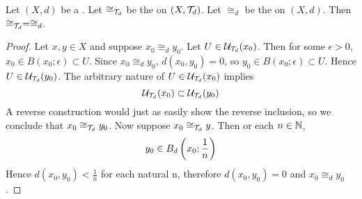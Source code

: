 
\begin{prop}
    \label{prop:relationofzerodistance}
    Let $(X,d)$ be a \PseudometricSpace.
    Let $\cong_{\mathcal{T}_d}$ be the \RelationOfEqualNeighborhoodFilters on $(X,\mathcal{T}_d)$. 
    Let $\cong_d$ be the \RelationOfZeroDistance on $(X,d)$. 
    Then $\cong_{\mathcal{T}_d} = \cong_d$. 
    \begin{proof}
        Let $x,y \in X$ and suppose $x_0 \cong_d y_0$.
        Let $U \in \mathcal{U}_{\mathcal{T}_d}(x_0)$. Then for some $\epsilon > 0$, 
        $x_0 \in B(x_0;\epsilon) \subset U$. 
        Since $x_0 \cong_d y_0$, $d(x_0,y_0) = 0$, so $y_0 \in B(x_0 ; \epsilon) \subset U$. 
        Hence $U \in \mathcal{U}_{\mathcal{T}_d}(y_0)$. 
        The arbitrary nature of $U \in \mathcal{U}_{\mathcal{T}_d}(x_0)$ implies 
        \begin{equation}
            \mathcal{U}_{\mathcal{T}_d}(x_0) \subset \mathcal{U}_{\mathcal{T}_d}(y_0)
        \end{equation}
        A reverse construction would just as easily show the reverse inclusion, so we conclude that $x_0 \cong_{\mathcal{T}_d} y_0$. 
        Now suppose $x_0 \cong_{\mathcal{T}_d} y $. Then or each $n \in \mathbb{N}$, 
        \begin{equation}
            y_0 \in B_{d} \left( x_0 ; \frac{1}{n}\right)
        \end{equation}
        Hence $d(x_0, y_0) < \frac{1}{n}$ for each natural n, therefore $d(x_0,y_0) = 0$ and $x_0 \cong_d y_0$. 
    \end{proof}
\end{prop}